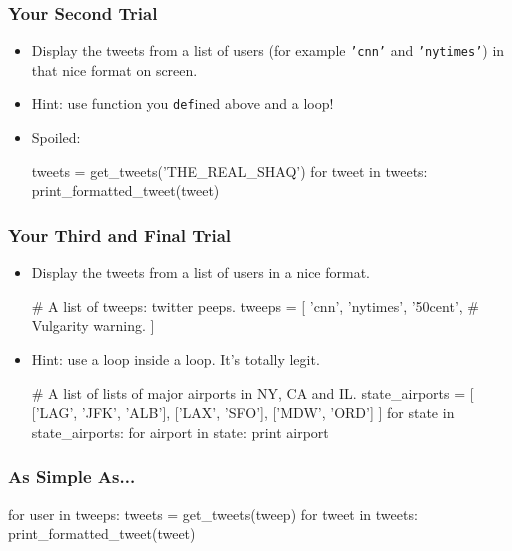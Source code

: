 \documentclass[10pt]{beamer}
\begin{document}
\begin{frame}[fragile]
  \frametitle{Your Second Trial}
  \begin{itemize}
    \item Display the tweets from a list of users (for example \texttt{'cnn'} and \texttt{'nytimes'}) in that nice format on screen.
    \item Hint: use function you \texttt{def}ined above and a loop!
    \item<2> Spoiled:
      \begin{pythoncode}
  tweets = get_tweets('THE_REAL_SHAQ')
  for tweet in tweets:
    print_formatted_tweet(tweet)
      \end{pythoncode}
  \end{itemize}
\end{frame}

\begin{frame}[fragile]
  \frametitle{Your Third and Final Trial}
  \begin{itemize}
    \item Display the tweets from a list of users in a nice format.
      \begin{pythoncode}
  # A list of tweeps: twitter peeps.
  tweeps = [
    'cnn',
    'nytimes',
    '50cent', # Vulgarity warning.
  ]
      \end{pythoncode}
    \item Hint: use a loop inside a loop.
      It's totally legit.
      \footnotesize
      \begin{pythoncode}
  # A list of lists of major airports in NY, CA and IL.
  state_airports = [
    ['LAG', 'JFK', 'ALB'], 
    ['LAX', 'SFO'], ['MDW', 'ORD']
  ]
  for state in state_airports:
    for airport in state:
      print airport
      \end{pythoncode}
  \end{itemize}
\end{frame}

\begin{frame}[fragile]
  \frametitle{As Simple As...}
  \begin{pythoncode}
  for user in tweeps:
    tweets = get_tweets(tweep)
    for tweet in tweets:
      print_formatted_tweet(tweet)
  \end{pythoncode}
\end{frame}
\end{document}

